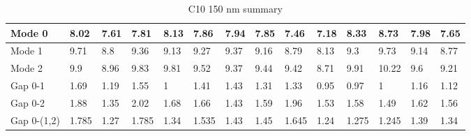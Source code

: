 \begin{table}[]
\centering
\begin{tabular}{|l|l|l|l|l|l|l|l|l|l|l|l|l|l|}
\hline
Mode 0 & 8.02 & 7.61 & 7.81 & 8.13 & 7.86 & 7.94 & 7.85 & 7.46 & 7.18 & 8.33 & 8.73 & 7.98 & 7.65 \\ \hline
Mode 1 & 9.71 & 8.8 & 9.36 & 9.13 & 9.27 & 9.37 & 9.16 & 8.79 & 8.13 & 9.3 & 9.73 & 9.14 & 8.77 \\ \hline
Mode 2 & 9.9 & 8.96 & 9.83 & 9.81 & 9.52 & 9.37 & 9.44 & 9.42 & 8.71 & 9.91 & 10.22 & 9.6 & 9.21 \\ \hline
Gap 0-1 & 1.69 & 1.19 & 1.55 & 1 & 1.41 & 1.43 & 1.31 & 1.33 & 0.95 & 0.97 & 1 & 1.16 & 1.12 \\ \hline
Gap 0-2 & 1.88 & 1.35 & 2.02 & 1.68 & 1.66 & 1.43 & 1.59 & 1.96 & 1.53 & 1.58 & 1.49 & 1.62 & 1.56 \\ \hline
Gap 0-(1,2) & 1.785 & 1.27 & 1.785 & 1.34 & 1.535 & 1.43 & 1.45 & 1.645 & 1.24 & 1.275 & 1.245 & 1.39 & 1.34 \\ \hline
\end{tabular}
\caption{C10 150 nm summary}
\label{C10summary}
\end{table}

